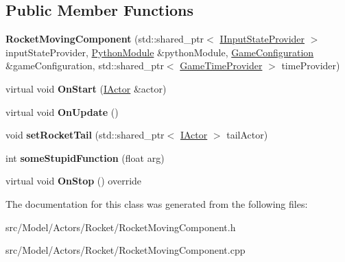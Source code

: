 \subsection*{Public Member Functions}
\begin{DoxyCompactItemize}
\item 
{\bfseries Rocket\+Moving\+Component} (std\+::shared\+\_\+ptr$<$ \hyperlink{classIInputStateProvider}{I\+Input\+State\+Provider} $>$ input\+State\+Provider, \hyperlink{classPythonModule}{Python\+Module} \&python\+Module, \hyperlink{classGameConfiguration}{Game\+Configuration} \&game\+Configuration, std\+::shared\+\_\+ptr$<$ \hyperlink{classGameTimeProvider}{Game\+Time\+Provider} $>$ time\+Provider)\hypertarget{classRocketMovingComponent_a5ec9b072dd72a25b97641f8e0d10d461}{}\label{classRocketMovingComponent_a5ec9b072dd72a25b97641f8e0d10d461}

\item 
virtual void {\bfseries On\+Start} (\hyperlink{classIActor}{I\+Actor} \&actor)\hypertarget{classRocketMovingComponent_ae3a2cfb0b53bcfef4e0f6f3ec9aa6f45}{}\label{classRocketMovingComponent_ae3a2cfb0b53bcfef4e0f6f3ec9aa6f45}

\item 
virtual void {\bfseries On\+Update} ()\hypertarget{classRocketMovingComponent_a3ad22a4771ee5452dfdf69bfb6c84e38}{}\label{classRocketMovingComponent_a3ad22a4771ee5452dfdf69bfb6c84e38}

\item 
void {\bfseries set\+Rocket\+Tail} (std\+::shared\+\_\+ptr$<$ \hyperlink{classIActor}{I\+Actor} $>$ tail\+Actor)\hypertarget{classRocketMovingComponent_a9cb27855fdc7b182938ef27abc8bc221}{}\label{classRocketMovingComponent_a9cb27855fdc7b182938ef27abc8bc221}

\item 
int {\bfseries some\+Stupid\+Function} (float arg)\hypertarget{classRocketMovingComponent_a335ef323bba4076587d1d8311c85620d}{}\label{classRocketMovingComponent_a335ef323bba4076587d1d8311c85620d}

\item 
virtual void {\bfseries On\+Stop} () override\hypertarget{classRocketMovingComponent_a32f5471db1ea94e638f574867b35026d}{}\label{classRocketMovingComponent_a32f5471db1ea94e638f574867b35026d}

\end{DoxyCompactItemize}


The documentation for this class was generated from the following files\+:\begin{DoxyCompactItemize}
\item 
src/\+Model/\+Actors/\+Rocket/Rocket\+Moving\+Component.\+h\item 
src/\+Model/\+Actors/\+Rocket/Rocket\+Moving\+Component.\+cpp\end{DoxyCompactItemize}
